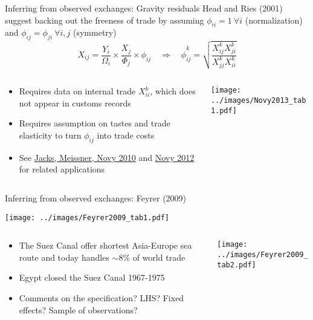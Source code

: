 \documentclass[10pt,notes=hide]{beamer}
\begin{document}
\begin{frame}{Inferring from observed exchanges: Gravity residuals}
Head and Ries (2001) suggest backing out the freeness of trade by assuming
$\phi_{ii}=1 \ \forall i$ (normalization) and $\phi_{ij}=\phi_{ji} \ \forall i,j$ (symmetry)
\begin{equation*}
X_{ij} = {\frac{Y_i}{\Omega_i}} \times {\frac{X_j}{\Phi_j}} \times \phi_{ij}
\quad \Rightarrow \quad
\hat{\phi}^k_{ij}=\sqrt{\frac{X^k_{ij}X^k_{ji}}{X^k_{jj}X^k_{ii}}}
\end{equation*}
\vspace{-3mm}
\begin{columns}
\begin{column}{.52\textwidth}
\begin{itemize}
	\item Requires data on internal trade $X_{ii}^k$, which does not appear in customs records
	\item Requires assumption on tastes and trade elasticity to turn $\phi_{ij}$ into trade costs
	\item See \href{https://www-sciencedirect-com.proxy.uchicago.edu/science/article/pii/S0014498309000382}{Jacks, Meissner, Novy 2010} and \href{https://onlinelibrary-wiley-com.proxy.uchicago.edu/doi/abs/10.1111/j.1465-7295.2011.00439.x}{Novy 2012} for related applications
\end{itemize}
\end{column}
\begin{column}{.45\textwidth}
\texttt{[image: ../images/Novy2013\_tab1.pdf]}
\end{column}
\end{columns}
\end{frame}
\begin{frame}{Inferring from observed exchanges: Feyrer (2009)}
\begin{center}
\texttt{[image: ../images/Feyrer2009\_tab1.pdf]}
\end{center}
\vspace{-5mm}
\begin{columns}
\begin{column}{.62\textwidth}
\begin{itemize}
	\item The Suez Canal offer shortest Asia-Europe sea route and today handles $\sim 8\%$ of world trade
	\item Egypt closed the Suez Canal 1967-1975
	\item Comments on the specification? LHS? Fixed effects? Sample of observations?
\end{itemize}
\end{column}
\begin{column}{.36\textwidth}
\texttt{[image: ../images/Feyrer2009\_tab2.pdf]}
\end{column}
\end{columns}
\end{frame}
\end{document}
